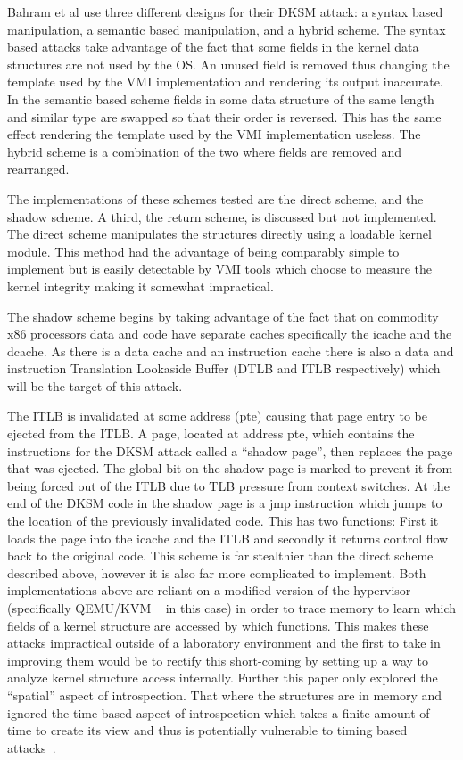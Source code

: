 Bahram et al use three different designs for their DKSM attack: a syntax based manipulation, a semantic based manipulation, and a hybrid scheme. The syntax based attacks take advantage of the fact that some fields in the kernel data structures are not used by the OS. An unused field is removed thus changing the template used by the VMI implementation and rendering its output inaccurate.  In the semantic based scheme fields in some data structure of the same length and similar type are swapped so that their order is reversed. This has the same effect rendering the template used by the VMI implementation useless. The hybrid scheme is a combination of the two where fields are removed and rearranged. 

The implementations of these schemes tested are the direct scheme, and the shadow scheme. A third, the return scheme, is discussed but not implemented. The direct scheme manipulates the structures directly using a loadable kernel module. This method had the advantage of being comparably simple to implement but is easily detectable by VMI tools which choose to measure the kernel integrity making it somewhat impractical. 

The shadow scheme begins by taking advantage of the fact that on commodity x86 processors data and code have separate caches specifically the icache and the dcache. As there is a data cache and an instruction cache there is also a data and instruction Translation Lookaside Buffer (DTLB and ITLB respectively) which will be the target of this attack. 

The ITLB is invalidated at some address (pte) causing that page entry to be ejected from the ITLB. A page, located at address pte, which contains the instructions for the DKSM attack called a ``shadow page'', then replaces the page that was ejected. The global bit on the shadow page is marked to prevent it from being forced out of the ITLB due to TLB pressure from context switches. At the end of the DKSM code in the shadow page is a jmp instruction which jumps to the location of the previously invalidated code. This has two functions: First it loads the page into the icache and the ITLB and secondly it returns control flow back to the original code. This scheme is far stealthier than the direct scheme described above, however it is also far more complicated to implement. Both implementations above are reliant on a modified version of the hypervisor (specifically QEMU/KVM ~\cite{bellard_qemu_2005} in this case) in order to trace memory to learn which fields of a kernel structure are accessed by which functions. This makes these attacks impractical outside of a laboratory environment and the first to take in improving them would be to rectify this short-coming by setting up a way to analyze kernel structure access internally. Further this paper only explored the ``spatial'' aspect of introspection. That where the structures are in memory and ignored the time based aspect of introspection which takes a finite amount of time to create its view and thus is potentially vulnerable to timing based attacks~\cite{bahram_dksm:_2010}. 
